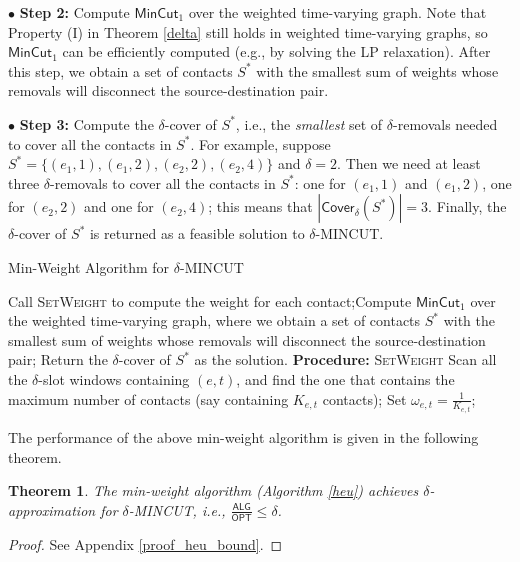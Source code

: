 \documentclass[10pt, conference, letterpaper]{IEEEtran}
\newtheorem{theorem}{Theorem}
\begin{document}
\vspace{1mm}

\noindent $\bullet$ \textbf{Step 2:} Compute $\mathsf{MinCut}_{1}$ over the weighted time-varying graph.  Note that Property (I) in Theorem \ref{delta} still holds in weighted time-varying graphs, so $\mathsf{MinCut}_1$ can be efficiently computed (e.g., by solving the LP relaxation). After this step, we obtain a set of contacts $S^*$ with the smallest sum of weights whose removals will disconnect the source-destination pair.

\vspace{1mm}

\noindent $\bullet$ \textbf{Step 3:} Compute the $\delta$-cover of $S^*$, i.e., the \emph{smallest} set of $\delta$-removals needed to cover all the contacts in $S^*$. For example, suppose $S^*=\{(e_1,1),(e_1,2),(e_2,2),(e_2,4)\}$ and $\delta=2$. Then we need at least three $\delta$-removals to cover all the contacts in $S^*$: one for $(e_1,1)$ and $(e_1,2)$, one for $(e_2,2)$ and one for $(e_2,4)$; this means that $|\mathsf{Cover_{\delta}}(S^*)|=3$. Finally, the $\delta$-cover of $S^*$ is returned as a feasible solution to $\delta$-MINCUT.



\begin{algorithm}[ht]
 \caption{Min-Weight Algorithm for $\delta$-MINCUT}\label{heu}
    \begin{algorithmic}[1]
\STATE Call \textsc{SetWeight} to compute the weight for each contact;\STATE Compute $\mathsf{MinCut}_1$ over the weighted time-varying graph, where we obtain a set of contacts $S^*$ with the smallest sum of weights whose removals will disconnect the source-destination pair;
\STATE Return the $\delta$-cover of $S^*$ as the solution.
\STATE \textbf{Procedure:} \textsc{SetWeight}
\STATE Scan all the $\delta$-slot windows containing $(e,t)$, and find the one that contains the maximum number of contacts (say containing $K_{e,t}$ contacts);
\STATE Set $\omega_{e,t}=\frac{1}{K_{e,t}}$;
\ENDFOR
\end{algorithmic}
\end{algorithm}

The performance of the above min-weight algorithm is given in the following theorem.
\begin{theorem}\label{heu_bound}
The min-weight algorithm (Algorithm \ref{heu}) achieves $\delta$-approximation for $\delta$-MINCUT, i.e., $\frac{\mathsf{ALG}}{\mathsf{OPT}}\le \delta$.
\end{theorem}
\begin{proof}
See Appendix \ref{proof_heu_bound}.
\end{proof}
\end{document}
